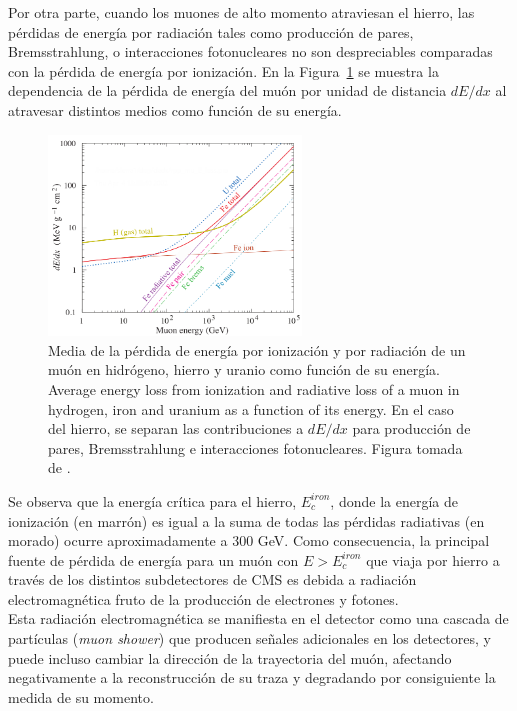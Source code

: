 Por otra parte, cuando los muones de alto momento atraviesan el hierro, las p\'erdidas de energ\'ia por radiaci\'on tales como producci\'on de pares, Bremsstrahlung, o interacciones fotonucleares no son despreciables comparadas con la p\'erdida de energ\'ia por ionizaci\'on. En la Figura~\ref{fig:dEdX} se muestra la dependencia de la p\'erdida de energ\'ia del mu\'on por unidad de distancia $dE/dx$ al atravesar distintos medios como funci\'on de su energ\'ia.

\begin{figure}
\centering
\includegraphics[width=0.60\textwidth]{figures/dEdx.png}
\caption{Media de la p\'erdida de energ\'ia por ionizaci\'on y por radiaci\'on de un mu\'on en hidr\'ogeno, hierro y uranio como funci\'on de su energ\'ia.  Average energy loss from ionization and radiative loss of a muon in hydrogen, iron and uranium as a function of its energy. En el caso del hierro, se separan las contribuciones a $dE/dx$ para producci\'on de pares, Bremsstrahlung e interacciones fotonucleares. Figura tomada de \cite{Tanabashi:2018oca}.}
\label{fig:dEdX}        
\end{figure}

Se observa que la energ\'ia cr\'itica para el hierro, $E^{iron}_{c}$, donde la energ\'ia de ionizaci\'on (en marr\'on) es igual a la suma de todas las p\'erdidas radiativas (en morado) ocurre aproximadamente a 300 GeV. Como consecuencia, la principal fuente de p\'erdida de energ\'ia para un mu\'on con $E>E^{iron}_{c}$ que viaja por hierro a trav\'es de los distintos subdetectores de CMS es debida a radiaci\'on electromagn\'etica fruto de la producci\'on de electrones y fotones. \\
Esta radiaci\'on electromagn\'etica se manifiesta en el detector como una cascada de part\'iculas (\textit{muon shower}) que producen se\~nales adicionales en los detectores, y puede incluso cambiar la direcci\'on de la trayectoria del mu\'on, afectando negativamente a la reconstrucci\'on de su traza y degradando por consiguiente la medida de su momento. \\

